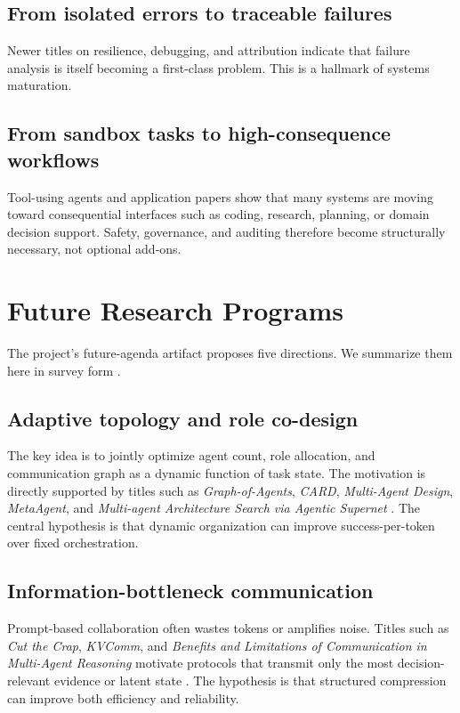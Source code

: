 \documentclass[11pt]{article}
\begin{document}
\subsection{From isolated errors to traceable failures}
Newer titles on resilience, debugging, and attribution indicate that failure analysis is itself becoming a first-class problem. This is a hallmark of systems maturation.

\subsection{From sandbox tasks to high-consequence workflows}
Tool-using agents and application papers show that many systems are moving toward consequential interfaces such as coding, research, planning, or domain decision support. Safety, governance, and auditing therefore become structurally necessary, not optional add-ons.

\section{Future Research Programs}
The project's future-agenda artifact proposes five directions. We summarize them here in survey form \cite{future_directions}.

\subsection{Adaptive topology and role co-design}
The key idea is to jointly optimize agent count, role allocation, and communication graph as a dynamic function of task state. The motivation is directly supported by titles such as \emph{Graph-of-Agents}, \emph{CARD}, \emph{Multi-Agent Design}, \emph{MetaAgent}, and \emph{Multi-agent Architecture Search via Agentic Supernet} \cite{iclr_subset,icml_list}. The central hypothesis is that dynamic organization can improve success-per-token over fixed orchestration.

\subsection{Information-bottleneck communication}
Prompt-based collaboration often wastes tokens or amplifies noise. Titles such as \emph{Cut the Crap}, \emph{KVComm}, and \emph{Benefits and Limitations of Communication in Multi-Agent Reasoning} motivate protocols that transmit only the most decision-relevant evidence or latent state \cite{iclr_subset}. The hypothesis is that structured compression can improve both efficiency and reliability.
\end{document}
